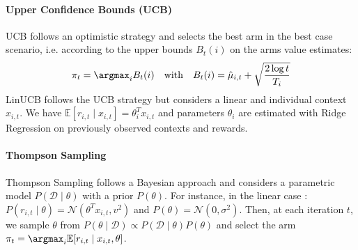 \paragraph{Upper Confidence Bounds (UCB)}
UCB \cite{auer2002using} follows an optimistic strategy and selects the best arm in the best case scenario, i.e. according to the upper bounds $B_t(i)$ on the arms value estimates:
$$
\pi_t = \argmax_i B_t(i)
\quad \text{with} \quad
B_t(i) = \hat{\mu}_{i,t} + \sqrt{\frac{2 \log t}{T_i}}
$$
LinUCB \cite{li2010contextual} follows the UCB strategy but considers a linear and individual context $x_{i,t}$. We have $\mathbb{E}[r_{i,t} \mid x_{i,t}] = \theta_i^T x_{i,t}$ and parameters $\theta_i$ are estimated with Ridge Regression on previously observed contexts and rewards.

\paragraph{Thompson Sampling}
Thompson Sampling \cite{kaufmann2012thompson} follows a Bayesian approach and considers a parametric model $P(\mathcal{D} \mid \theta)$ with a prior $P(\theta)$. For instance, in the linear case \cite{agrawal2013thompson}: $P(r_{i,t} \mid \theta) = \mathcal{N}(\theta^T x_{i,t}, v^2)$ and $P(\theta) = \mathcal{N}(0, \sigma^2)$. Then, at each iteration $t$, we sample $\theta$ from $P(\theta \mid \mathcal{D}) \propto P(\mathcal{D}\mid\theta) P(\theta)$ and select the arm $\pi_t = \argmax_i \mathbb{E}[r_{i,t} \mid x_{i,t}, \theta]$.